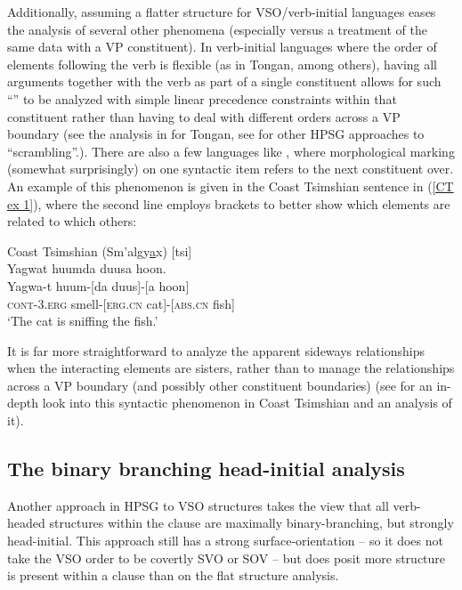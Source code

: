 \documentclass[output=paper]{langsci/langscibook}
\begin{document}
{Additionally, assuming a flatter structure for VSO/verb-initial languages eases the analysis of several other phenomena (especially versus a treatment of the same data with a VP constituent). In verb-initial languages where the order of elements following the verb is flexible (as in Tongan, among others), having all arguments together with the verb as part of a single constituent allows for such ``'' to be analyzed with simple linear precedence constraints within that constituent rather than having to deal with different orders across a VP boundary (see the analysis in \citealt[Chapter 3]{ball08thesis} for Tongan, see  for other HPSG approaches to ``scrambling''.). There are also a few languages like , where morphological marking (somewhat surprisingly) on one syntactic item refers to the next constituent over. An example of this phenomenon is given in the Coast Tsimshian sentence in (\ref{CT ex 1}), where the second line employs brackets to better show which elements are related to which others:        
%
\begin{samepage}
\begin{exe}
\ex\label{CT ex 1} Coast Tsimshian (Sm'algy\underline{a}x) [tsi] \citep[32]{mulder94} \\
 Yagwat huumda duusa hoon. \\
\gll Yagwa-t huum-[da duus]-[a hoon] \\
 \textsc{cont}-\textsc{3.erg} smell-[\textsc{erg.cn} cat]-[\textsc{abs.cn} fish] \\
\trans `The cat is sniffing the fish.' 
\end{exe}
\end{samepage}
%
It is far more straightforward to analyze the apparent sideways relationships when the interacting elements are sisters, rather than to manage the relationships across a VP boundary (and possibly other constituent boundaries) (see \citealt{ball11} for an in-depth look into this syntactic phenomenon in Coast Tsimshian and an analysis of it).  

\subsection{The binary branching head-initial analysis} 

Another approach in HPSG to VSO structures takes the view that all verb-headed structures within the clause are maximally binary-branching, but strongly head-initial. This approach still has a strong surface-orientation -- so it does not take the VSO order to be covertly SVO or SOV -- but does posit more structure is present within a clause than on the flat structure analysis. 

}
\end{document}
